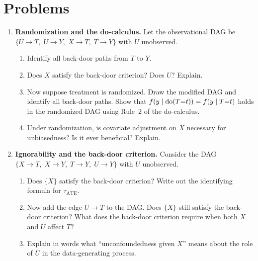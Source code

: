 \documentclass[master.tex]{subfiles}
\begin{document}
\section*{Problems}

\begin{enumerate}

\item \textbf{Randomization and the do-calculus.}
  Let the observational DAG be
  $\{U \to T,\; U \to Y,\; X \to T,\; T \to Y\}$
  with $U$ unobserved.
  \begin{enumerate}
    \item Identify all back-door paths from $T$ to $Y$.
    \item Does $X$ satisfy the back-door criterion?  Does $U$?  Explain.
    \item Now suppose treatment is randomized.  Draw the modified DAG
      and identify all back-door paths.  Show that
      $f(y \mid \mathrm{do}(T{=}t)) = f(y \mid T{=}t)$ holds in the
      randomized DAG using Rule~2 of the do-calculus.
    \item Under randomization, is covariate adjustment on $X$ necessary
      for unbiasedness?  Is it ever beneficial?  Explain.
  \end{enumerate}

\item \textbf{Ignorability and the back-door criterion.}
  Consider the DAG $\{X \to T,\; X \to Y,\; T \to Y,\; U \to Y\}$
  with $U$ unobserved.
  \begin{enumerate}
    \item Does $\{X\}$ satisfy the back-door criterion?  Write out the
      identifying formula for $\tau_{\mathrm{ATE}}$.
    \item Now add the edge $U \to T$ to the DAG.  Does $\{X\}$ still
      satisfy the back-door criterion?  What does the back-door criterion
      require when both $X$ and $U$ affect $T$?
    \item Explain in words what ``unconfoundedness given $X$'' means
      about the role of $U$ in the data-generating process.
  \end{enumerate}


\end{enumerate}
\end{document}
